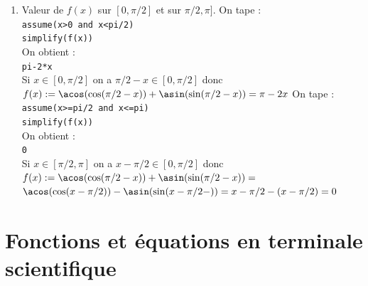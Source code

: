 \documentclass[a4paper,11pt]{book}
\begin{document}
\begin{enumerate}
\item Valeur de $f(x)$ sur $[0,\pi/2]$ et sur $\pi/2,\pi]$.
On tape :\\
{\tt assume(x>0 and x<pi/2)}\\
{\tt simplify(f(x))}\\
On obtient :\\
{\tt pi-2*x}\\
Si $x\in [0,\pi/2]$ on a $\pi/2-x\in [0,\pi/2]$ donc
$f(x):=\acos(\cos(\pi/2-x))+\asin(\sin(\pi/2-x))=\pi-2x$
On tape :\\
{\tt assume(x>=pi/2 and x<=pi)}\\
{\tt simplify(f(x))}\\
On obtient :\\
{\tt 0}\\
Si $x\in [\pi/2,\pi]$ on a $x-\pi/2\in [0,\pi/2]$ donc
$f(x):=\acos(\cos(\pi/2-x))+\asin(\sin(\pi/2-x))=$\\
$\acos(\cos(x-\pi/2))-\asin(\sin(x-\pi/2-))=x-\pi/2-(x-\pi/2)=0$

\end{enumerate}





\chapter{Fonctions et \'equations en terminale scientifique}
\end{document}
